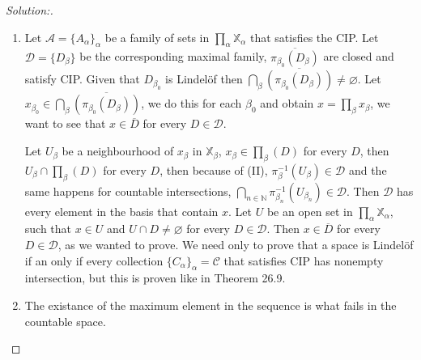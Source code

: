 \documentclass[a4paper,12pt, reqno]{article}
\theoremstyle{definition}
\newenvironment{solution}{\begin{proof}[Solution:]}{\end{proof}}
\newcommand{\A}{\mathscr{A}}
\newcommand{\D}{\mathscr{D}}
\newcommand{\C}{\mathscr{C}}
\newcommand{\N}{\mathbb{N}}
\newcommand{\X}{\mathbb{X}}
\begin{document}
\begin{solution}
  \begin{enumerate}[label=(\alph*)]
    \item Let $\A = \{ A_{\alpha} \}_{\alpha}$ be a family of sets in $\prod_{\alpha}\X_{\alpha}$ that satisfies the CIP. Let $\D = \{ D_{\beta} \}$ be the corresponding maximal family, $\overline{\pi_{\beta_{0}}(D_{\beta})}$ are closed and satisfy CIP.
    Given that $D_{\beta_{0}}$ is Lindelöf then $\bigcap_{\beta}\overline{(\pi_{\beta_{0}}(D_{\beta}))}\neq \varnothing$. Let $x_{\beta_{0}}\in\bigcap_{\beta}\overline{(\pi_{\beta_{0}}(D_{\beta}))}$, we do this for each $\beta_{0}$ and obtain $x = \prod_{\beta}x_{\beta}$, we want to see that $x\in \overline{D}$ for every $D\in\D$.

    Let $U_{\beta}$ be a neighbourhood of $x_{\beta}$ in $\X_{\beta}$, $x_{\beta}\in\prod_{\beta}(D)$ for every $D$, then $U_{\beta}\cap\prod_{\beta}(D)$ for every $D$, then because of (II), $\pi_{\beta}^{-1}(U_{\beta})\in\D$ and the same happens for countable intersections, $\bigcap_{n\in\N}\pi_{\beta_{n}}^{-1}(U_{\beta_{n}})\in\D$. Then $\D$ has every element in the basis that contain $x$. Let $U$ be an open set in $\prod_{\alpha}\X_{\alpha}$, such that $x\in U$ and $U\cap D\neq \varnothing$ for every $D\in\D$. Then $x\in \overline{D}$ for every $D\in\D$, as we wanted to prove. We need only to prove that a space is Lindelöf if an only if every collection $\{ C_{\alpha} \}_{\alpha} = \C$ that satisfies CIP has nonempty intersection, but this is proven like in Theorem 26.9.

    \item The existance of the maximum element in the sequence is what fails in the countable space.
  \end{enumerate}
\end{solution}
\end{document}
